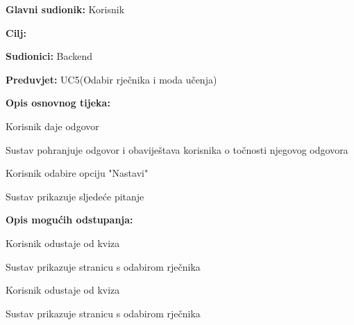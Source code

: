 					\noindent {}
					\begin{packed_item}
						
						\item \textbf{Glavni sudionik: } Korisnik
						\item  \textbf{Cilj:} 
						\item  \textbf{Sudionici:} Backend
						\item  \textbf{Preduvjet:} UC5(Odabir rječnika i moda učenja)
						\item  \textbf{Opis osnovnog tijeka:}
						
						\item[] \begin{packed_enum}
							
							\item Korisnik daje odgovor
							\item Sustav pohranjuje odgovor i obaviještava korisnika o točnosti njegovog odgovora
							\item Korisnik odabire opciju "Nastavi"
							\item Sustav prikazuje sljedeće pitanje
						\end{packed_enum}
						
						\item  \textbf{Opis mogućih odstupanja:}
						
						\item[] \begin{packed_item}
							
							\item[3.a] Korisnik odustaje od kviza
							\item[] \begin{packed_enum}
								
								\item Sustav prikazuje stranicu s odabirom rječnika
								
							\end{packed_enum}
							
							\item[4.a] Korisnik odustaje od kviza 
							\item[] \begin{packed_enum}
								
								\item Sustav prikazuje stranicu s odabirom rječnika
								
							\end{packed_enum}
							
						\end{packed_item}
					\end{packed_item}
					
